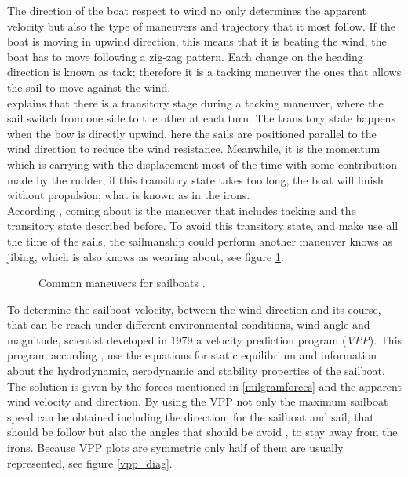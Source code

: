 The direction of the boat respect to wind no only determines the apparent velocity but also the type of maneuvers and trajectory that it most follow. If the boat is moving in upwind direction, this means that it is beating the wind, the boat has to move following a zig-zag pattern.  Each change on the heading direction is known as tack; therefore it is a tacking maneuver the ones that allows the sail to move against the wind. \\ \cite{denny2009float} explains that there is a transitory stage during a tacking maneuver, where the sail switch from one side to the other at each turn.  The transitory state happens when the bow is directly upwind, here the sails are positioned parallel to the wind direction to reduce the wind resistance. Meanwhile, it is the momentum which is carrying with the displacement most of the time with some contribution made by the rudder, if this transitory state takes too long, the boat will finish without propulsion; what is known as in the irons. \\According \cite{denny2009float}, coming about is the maneuver that includes tacking and the transitory state described before.  To avoid this transitory state, and make use all the time of the sails, the sailmanship could perform another maneuver knows as jibing, which is also knows as wearing about, see figure \ref{manoeuvers}.\par 

\begin{figure}[ht]
  \centering
  \hfill
   \centering
  \caption{Common maneuvers for sailboats \cite{denny2009float}.}
\label{manoeuvers} 
\end{figure}

To determine the sailboat velocity, between the wind direction and its course, that can be reach under different environmental conditions, wind angle and magnitude, scientist developed in 1979 a velocity prediction program (\textit{VPP}). This program according  \cite{larsonprinciples}, use the equations for static equilibrium and information about the hydrodynamic, aerodynamic and stability properties of the sailboat.  The solution is given by  the forces mentioned in \ref{milgramforces} and the apparent wind velocity and direction. By using the VPP not only the maximum sailboat speed can be obtained including the direction, for the sailboat and sail, that should be follow but also the angles that should be avoid \cite{yang2011control}, to stay away from the irons. Because VPP plots are symmetric only half of them are usually represented, see figure \ref {vpp_diag}. 

